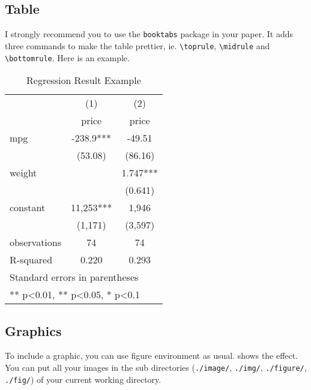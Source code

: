\documentclass{elegantpaper}
\begin{document}
\subsection{Table}
I strongly recommend you to use the \verb|booktabs| package in your paper. It adds three commands to make the table prettier, ie. \verb|\toprule|, \verb|\midrule| and \verb|\bottomrule|. Here is an example.

\begin{table}[!htbp]
  \small
  \centering
  \caption{Regression Result Example}
    \begin{tabular}{lll}
    \toprule
          & \multicolumn{1}{c}{(1)} & \multicolumn{1}{c}{(2)} \\
      & \multicolumn{1}{c}{price} & \multicolumn{1}{c}{price} \\
    \midrule
    mpg   & \multicolumn{1}{c}{-238.9***} & \multicolumn{1}{c}{-49.51} \\
          & \multicolumn{1}{c}{(53.08)} & \multicolumn{1}{c}{(86.16)} \\
    weight & \multicolumn{1}{c}{} & \multicolumn{1}{c}{1.747***} \\
          & \multicolumn{1}{c}{} & \multicolumn{1}{c}{(0.641)} \\
    constant & \multicolumn{1}{c}{11,253***} & \multicolumn{1}{c}{1,946} \\
          & \multicolumn{1}{c}{(1,171)} & \multicolumn{1}{c}{(3,597)} \\
    observations & \multicolumn{1}{c}{74} & \multicolumn{1}{c}{74} \\
    R-squared & \multicolumn{1}{c}{0.220} & \multicolumn{1}{c}{0.293} \\
    \midrule
    \multicolumn{3}{l}{\scriptsize Standard errors in parentheses} \\
    \multicolumn{3}{l}{\scriptsize *** p<0.01, ** p<0.05, * p<0.1} \\
    \end{tabular}%
  \label{tab:reg}%
\end{table}%



\subsection{Graphics}
To include a graphic, you can use figure environment as usual.  shows the effect. You can put all your images in the sub directories (\verb|./image/|, \verb|./img/|, \verb|./figure/|, \verb|./fig/|) of your current working directory.
\end{document}
